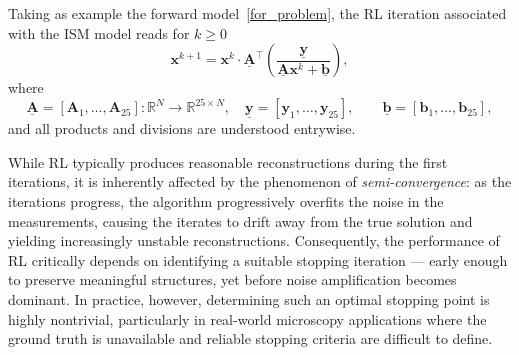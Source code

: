 \documentclass[letterpaper]{article}
\newcommand{\x}{\mathbf{x}}
\begin{document}
Taking as example the forward model~\eqref{for_problem}, the RL iteration associated with the ISM model reads for $k\geq 0$
\begin{equation}
\label{eq: Richardson-Lucy}
\x^{k+1}
=
\x^k
\cdot
\underline{\mathbf{A}}^\top
\left(
\frac{\underline{\mathbf{y}}}
{\underline{\mathbf{A}}\x^k+\underline{\mathbf{b}}}
\right),
\end{equation}
where
\[
\underline{\mathbf{A}}
=
[\mathbf{A}_1,\dots,\mathbf{A}_{25}]
:
\mathbb{R}^N
\to
\mathbb{R}^{25\times N},\quad
\underline{\mathbf{y}}
=
[\mathbf{y}_1,\dots,\mathbf{y}_{25}],
\qquad
\underline{\mathbf{b}}
=
[\mathbf{b}_1,\dots,\mathbf{b}_{25}],
\]
and all products and divisions are understood entrywise.

While RL typically produces reasonable reconstructions during the first iterations, it is inherently affected by the phenomenon of \emph{semi-convergence}: as the iterations progress, the algorithm progressively overfits the noise in the measurements, causing the iterates to drift away from the true solution and yielding increasingly unstable reconstructions. Consequently, the performance of RL critically depends on identifying a suitable stopping iteration --- early enough to preserve meaningful structures, yet before noise amplification becomes dominant. In practice, however, determining such an optimal stopping point is highly nontrivial, particularly in real-world microscopy applications where the ground truth is unavailable and reliable stopping criteria are difficult to define.
\end{document}
